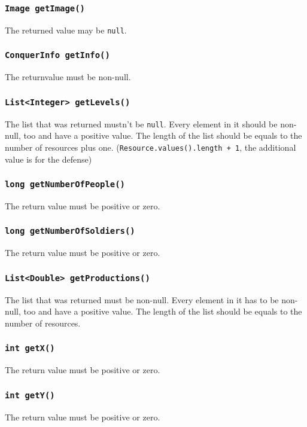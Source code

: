 \documentclass{article}
\begin{document}
\subsubsection{\texttt{Image getImage()}}
The returned value may be \texttt{null}.

\subsubsection{\texttt{ConquerInfo getInfo()}}
The returnvalue must be non-null.

\subsubsection{\texttt{List<Integer> getLevels()}}
The list that was returned mustn't be \texttt{null}. Every element in it
should be non-null, too and have a positive value.
The length of the list should be equals to the number of resources plus one.
(\texttt{Resource.values().length + 1}, the additional value is for the defense)

\subsubsection{\texttt{long getNumberOfPeople()}}
The return value must be positive or zero.

\subsubsection{\texttt{long getNumberOfSoldiers()}}
The return value must be positive or zero.

\subsubsection{\texttt{List<Double> getProductions()}}
The list that was returned must be non-null. Every element in it has to be non-null,
too and have a positive value.
The length of the list should be equals to the number of resources.

\subsubsection{\texttt{int getX()}}
The return value must be positive or zero.

\subsubsection{\texttt{int getY()}}
The return value must be positive or zero.
\end{document}
